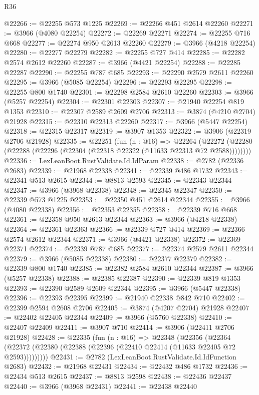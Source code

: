 \begin{lexlean}{R36}
\begin{coremodule}
@22266 := @22255 @573 @1225
@22269 := @22266 @451 @2614 @22260
@22271 := @3966 (@4080 @22254)
@22272 := @22269 @22271
@22274 := @22255 @716 @668
@22277 := @22274 @950 @2613 @22260
@22279 := @3966 (@4218 @22254)
@22280 := @22277 @22279
@22282 := @22255 @727 @414
@22285 := @22282 @2574 @2612 @22260
@22287 := @3966 (@4421 @22254)
@22288 := @22285 @22287
@22290 := @22255 @787 @685
@22293 := @22290 @2579 @2611 @22260
@22295 := @3966 (@5085 @22254)
@22296 := @22293 @22295
@22298 := @22255 @800 @1740
@22301 := @22298 @2584 @2610 @22260
@22303 := @3966 (@5257 @22254)
@22304 := @22301 @22303
@22307 := @21940 @22254 @819 @1353
@22310 := @22307 @2589 @2609 @2706
@22313 := @3874 (@4210 @2704) @21928
@22315 := @22310 @22313 @22260
@22317 := @3966 (@5447 @22254)
@22318 := @22315 @22317
@22319 := @3907 @1353
@22322 := @3906 (@22319 @2706 @21928)
@22335 := @22251
    (fun (n : @16) =>
    @22264 (@22272 (@22280 (@22288 (@22296 (@22304 (@22318 @22322 (@11633 @22313 @72 @2588))))))))
@22336 := LexLeanBoot.RustValidate.Id.IdParam
@22338 := @2782 (@22336 @2683)
@22339 := @21968 @22338
@22341 := @22339 @486 @1732
@22343 := @22341 @513 @2615
@22344 := @8813 @2593
@22345 := @22343 @22344
@22347 := @3966 (@3968 @22338)
@22348 := @22345 @22347
@22350 := @22339 @573 @1225
@22353 := @22350 @451 @2614 @22344
@22355 := @3966 (@4080 @22338)
@22356 := @22353 @22355
@22358 := @22339 @716 @668
@22361 := @22358 @950 @2613 @22344
@22363 := @3966 (@4218 @22338)
@22364 := @22361 @22363
@22366 := @22339 @727 @414
@22369 := @22366 @2574 @2612 @22344
@22371 := @3966 (@4421 @22338)
@22372 := @22369 @22371
@22374 := @22339 @787 @685
@22377 := @22374 @2579 @2611 @22344
@22379 := @3966 (@5085 @22338)
@22380 := @22377 @22379
@22382 := @22339 @800 @1740
@22385 := @22382 @2584 @2610 @22344
@22387 := @3966 (@5257 @22338)
@22388 := @22385 @22387
@22390 := @22339 @819 @1353
@22393 := @22390 @2589 @2609 @22344
@22395 := @3966 (@5447 @22338)
@22396 := @22393 @22395
@22399 := @21940 @22338 @842 @710
@22402 := @22399 @2594 @2608 @2706
@22405 := @3874 (@4207 @2704) @21928
@22407 := @22402 @22405 @22344
@22409 := @3966 (@5760 @22338)
@22410 := @22407 @22409
@22411 := @3907 @710
@22414 := @3906 (@22411 @2706 @21928)
@22428 := @22335
    (fun (n : @16) =>
    @22348
      (@22356
        (@22364 (@22372 (@22380 (@22388 (@22396 (@22410 @22414 (@11633 @22405 @72 @2593)))))))))
@22431 := @2782 (LexLeanBoot.RustValidate.Id.IdFunction @2683)
@22432 := @21968 @22431
@22434 := @22432 @486 @1732
@22436 := @22434 @513 @2615
@22437 := @8813 @2598
@22438 := @22436 @22437
@22440 := @3966 (@3968 @22431)
@22441 := @22438 @22440

\end{coremodule}
\end{lexlean}
